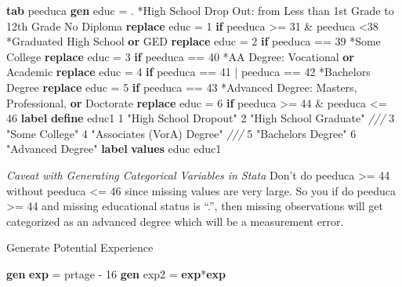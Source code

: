 \documentclass[
]{book}
\newenvironment{Shaded}{\begin{snugshade}}{\end{snugshade}}
\newcommand{\CommentTok}[1]{\textcolor[rgb]{0.56,0.35,0.01}{\textit{#1}}}
\newcommand{\FunctionTok}[1]{\textcolor[rgb]{0.13,0.29,0.53}{\textbf{#1}}}
\newcommand{\KeywordTok}[1]{\textcolor[rgb]{0.13,0.29,0.53}{\textbf{#1}}}
\newcommand{\NormalTok}[1]{#1}
\newcommand{\StringTok}[1]{\textcolor[rgb]{0.31,0.60,0.02}{#1}}
\begin{document}
\begin{Shaded}
\begin{Highlighting}[]
\KeywordTok{tab}\NormalTok{ peeduca}
\KeywordTok{gen}\NormalTok{ educ = .}
\NormalTok{*High School Drop Out: from Less than 1st Grade to 12th Grade No Diploma}
\KeywordTok{replace}\NormalTok{ educ = 1 }\KeywordTok{if}\NormalTok{ peeduca \textgreater{}= 31 \& peeduca \textless{}38}
\NormalTok{*Graduated High School }\KeywordTok{or}\NormalTok{ GED}
\KeywordTok{replace}\NormalTok{ educ = 2 }\KeywordTok{if}\NormalTok{ peeduca == 39}
\NormalTok{*Some College}
\KeywordTok{replace}\NormalTok{ educ = 3 }\KeywordTok{if}\NormalTok{ peeduca == 40}
\NormalTok{*AA Degree: Vocational }\KeywordTok{or}\NormalTok{ Academic}
\KeywordTok{replace}\NormalTok{ educ = 4 }\KeywordTok{if}\NormalTok{ peeduca == 41 | peeduca == 42}
\NormalTok{*Bachelor\textquotesingle{}s Degree}
\KeywordTok{replace}\NormalTok{ educ = 5 }\KeywordTok{if}\NormalTok{ peeduca == 43}
\NormalTok{*Advanced Degree: Master\textquotesingle{}s, Professional, }\KeywordTok{or}\NormalTok{ Doctorate}
\KeywordTok{replace}\NormalTok{ educ = 6 }\KeywordTok{if}\NormalTok{ peeduca \textgreater{}= 44 \& peeduca \textless{}= 46}
\KeywordTok{label} \KeywordTok{define}\NormalTok{ educ1 1 }\StringTok{"High School Dropout"}\NormalTok{ 2 }\StringTok{"High School Graduate"} \CommentTok{///}
\NormalTok{                   3 }\StringTok{"Some College"}\NormalTok{ 4 }\StringTok{"Associates (VorA) Degree"} \CommentTok{///}
\NormalTok{                           5 }\StringTok{"Bachelor\textquotesingle{}s Degree"}\NormalTok{ 6 }\StringTok{"Advanced Degree"}
\KeywordTok{label} \KeywordTok{values}\NormalTok{ educ educ1}
\end{Highlighting}
\end{Shaded}

\emph{Caveat with Generating Categorical Variables in Stata}
Don't do peeduca \textgreater= 44 without peeduca \textless= 46 since missing values are very large. So you if do peeduca \textgreater= 44 and missing educational status is ``.'', then missing observations will get categorized as an advanced degree which will be a measurement error.

Generate Potential Experience

\begin{Shaded}
\begin{Highlighting}[]
\KeywordTok{gen} \FunctionTok{exp}\NormalTok{ = prtage {-} 16}
\KeywordTok{gen}\NormalTok{ exp2 = }\FunctionTok{exp}\NormalTok{*}\FunctionTok{exp}
\end{Highlighting}
\end{Shaded}
\end{document}
